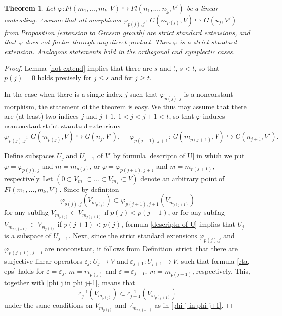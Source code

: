 \documentclass[12pt]{amsart}
\renewcommand{\phi}{\varphi}
\newtheorem{theorem}{Theorem}[section]
\theoremstyle{definition}
\begin{document}
\begin{theorem}\label{Thm 4.6}
 Let $\phi:Fl(m_1,...,m_k,V)\hookrightarrow Fl(n_1,...,
 n_{\tilde{k}},V')$ be a linear embedding.
Assume that all morphisms $\varphi_{p(j),j}:\ G(m_{p(j)},V)
\hookrightarrow G(n_j,V')$ from Proposition \ref{extension to 
Grassm growth} are strict standard extensions, and that $\phi
$ does not factor through any direct product. Then $\varphi$ 
is a strict standard extension. Analogous statements hold in 
the orthogonal and symplectic cases.
\end{theorem}
\begin{proof} 
Lemma \ref{not extend} implies that there are $s$ and $t$, $s<t
$, so that $p(j)=0$ holds precisely for $j\le s$ and for $j\ge 
t$. 

In the case when there is a single index $j$ such 
that $\phi_{p(j),j}$ is a nonconstant morphism, the 
statement of the theorem is easy. We thus may assume that there 
are (at least) two indices $j$ and $j+1$, $1<j<j+1<t$, so that 
$\phi$ induces nonconstant strict standard extensions
\begin{equation*}\label{phi j,j+1}
\phi_{p(j),j}:\ G(m_{p(j)},V)\hookrightarrow G(n_j,V'),\ \ \ \ 
\ \ \phi_{p(j+1),j+1}:\ G(m_{p(j+1)},V)\hookrightarrow 
G(n_{j+1},V').
\end{equation*}

Define subspaces $U_j$ and $U_{j+1}$ of $V'$ by formula 
\eqref{descriptn of U} in which we put $\phi=\phi_{p(j),j}$
and $m=m_{p(j)}$, or $\phi=\phi_{p(j+1),j+1}$ and $m=m_{p(j+1)}
$, respectively. Let $(0\subset V_{m_1}\subset...\subset V_{m_k
}\subset V)$ denote an arbitrary point of $Fl(m_1,...,m_k,V)$. 
Since by definition
\begin{equation}\label{phi j in phi j+1}
\phi_{p(j),j}(V_{m_{p(j)}})\subset
\phi_{p(j+1),j+1}(V_{m_{p(j+1)}}) 
\end{equation}
for any subflag $V_{m_{p(j)}}\subset V_{m_{p(j+1)}}$ if $p(j)
<p(j+1)$, or for any subflag $V_{m_{p(j+1)}}\subset 
V_{m_{p(j)}}$ if $p(j+1)<p(j)$, formula \eqref{descriptn  
of U} implies that $U_j$ is a subspace of $U_{j+1}$. Next, 
since the strict standard extensions $\phi_{p(j),j}$ and 
$\phi_{p(j+1), j+1}$ are nonconstant, it follows from 
Definition \ref{strict} that there are surjective linear 
operators $\varepsilon_j:U_j\to V$ and $\varepsilon_{j+1}:
U_{j+1}\to V$, such that formula \eqref{eta, eps} holds for 
$\varepsilon=\varepsilon_j,\ m=m_{p(j)}$ and $\varepsilon=
\varepsilon_{j+1},\ m=m_{p(j+1)}$, respectively. This, 
together with \eqref{phi j in phi j+1}, means that
\begin{equation}\label{eps j in}
\varepsilon_j^{-1}(V_{m_{p(j)}})\subset
\varepsilon_{j+1}^{-1}(V_{m_{p(j+1)}}) 
\end{equation}
under the same conditions on $V_{m_{p(j)}}$ and $V_{m_{p(j+1)}
}$ as in \eqref{phi j in phi j+1}.


\end{proof}
\end{document}
